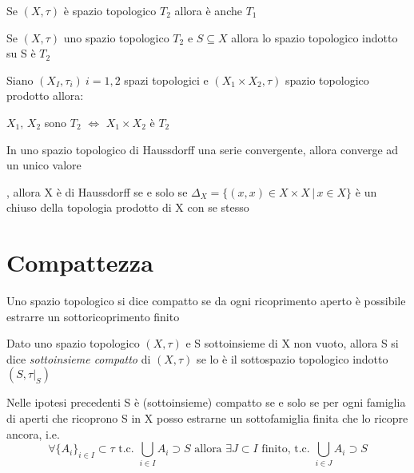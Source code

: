 \documentclass[a4paper]{article}
\begin{document}
\begin{prop}
	Se $(X,\tau)$ è spazio topologico $T_2$ allora è anche $T_1$ 
\end{prop}

\begin{prop}
	Se $(X,\tau )$ uno spazio topologico $T_2$ e $S\subseteq X$ allora lo spazio topologico indotto su S è $T_2$
\end{prop}

\begin{prop}
	Siano $(X_I,\tau_i) \: i=1,2$ spazi topologici e $(X_1 \times X_2 , \tau)$ spazio topologico prodotto allora:
	\begin{center}
		$X_1, \, X_2$ sono $T_2$ $ \Longleftrightarrow $ $X_1\times X_2$ è $T_2$
	\end{center}
\end{prop}

\begin{prop}
	In uno spazio topologico di Haussdorff una serie convergente, allora converge ad un unico valore
\end{prop}

\begin{prop}
	\xtausptop, allora X è di Haussdorff se e solo se $\Delta_X = \{ (x,x) \in X \times X \,|\, x \in X \}$ è un chiuso della topologia prodotto di X con se stesso
\end{prop}
\section{Compattezza}

\begin{deff}
	Uno spazio topologico si dice compatto se da ogni ricoprimento aperto è possibile estrarre un sottoricoprimento finito
\end{deff}

\begin{deff}
	Dato uno spazio topologico $(X,\tau)$ e S sottoinsieme di X non vuoto, allora S si dice \textit{sottoinsieme compatto} di $(X,\tau)$ se lo è il sottospazio topologico indotto $(S,\tau |_S)$
\end{deff}

\begin{oss}
	Nelle ipotesi precedenti S è (sottoinsieme) compatto se e solo se per ogni famiglia di aperti che ricoprono S in X posso estrarne un sottofamiglia finita che lo ricopre ancora, i.e.
	\[
	\forall \{A_i\}_{i\in I} \subset \tau \text{ t.c. } \bigcup_{i \in I } A_i \supset S \text{ allora } \exists J \subset I \text{ finito, t.c. }  \bigcup_{i \in J } A_i \supset S   \]
\end{oss}
\end{document}
